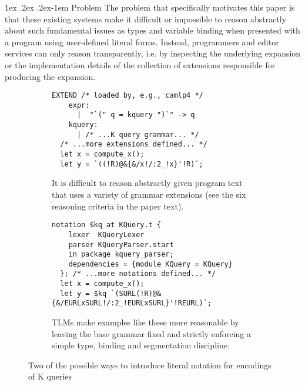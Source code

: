 \documentclass[acmsmall]{acmart}
\makeatletter
\renewcommand{\paragraph}{%
  \@startsection{paragraph}{4}%
  {\z@}{1ex \@plus .2ex \@minus .2ex}{-1em}%
  {\normalfont\normalsize\bfseries}%
}
\makeatother
\begin{document}
\paragraph{Problem} The problem that specifically motivates this paper is that these existing systems  make it difficult or impossible to reason abstractly about such fundamental issues as types and variable binding when presented with a program using user-defined literal forms. Instead, programmers and editor services can only reason transparently, i.e. by inspecting the underlying expansion or the implementation details of the collection of extensions responsible for producing the expansion.%
\begin{figure}[t!]
\vspace{4px}
\begin{subfigure}[t]{0.46\textwidth}
\begin{lstlisting}[xleftmargin=-2pt, morekeywords={EXTEND}]
  EXTEND /* loaded by, e.g., camlp4 */
    expr:
      |  "`(" q = kquery ")`" -> q
    kquery: 
      | /* ...K query grammar... */
  /* ...more extensions defined... */
  let x = compute_x();
  let y = `((!R)@&{&/x!/:2_!x}'!R)`;
\end{lstlisting}
\vspace{-5px}
\caption{It is difficult to reason abstractly given program text that uses a variety of grammar extensions (see the six reasoning criteria in the paper text).}
\label{fig:K-dialect}
\end{subfigure}
\hfill
\begin{subfigure}[t]{0.51\textwidth}
\begin{lstlisting}[xleftmargin=-2pt]
  notation $kq at KQuery.t {
    lexer  KQueryLexer
    parser KQueryParser.start
    in package kquery_parser;
    dependencies = {module KQuery = KQuery}
  }; /* ...more notations defined... */
  let x = compute_x();
  let y = $kq `(SURL(!R)@&{&/EURLxSURL!/:2_!EURLxSURL}'!REURL)`;
\end{lstlisting}
\vspace{-5px}
\caption{TLMs make examples like these more reasonable by leaving the base grammar fixed and strictly enforcing a simple type, binding and segmentation discipline.}
\label{fig:K-tsm-example}
\end{subfigure}
\vspace{2px}
\caption{Two of the possible ways to introduce literal notation for encodings of K queries}
\vspace{-4px}
\end{figure}
\end{document}
